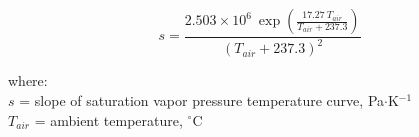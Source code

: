 \begin{equation}
\label{eq:sat}
	s = \frac{2.503\times 10^6\:\exp\left(\frac{17.27\: T_{air}}
			                                   {T_{air} + 237.3}\right)}
	         {\left(T_{air} + 237.3\right)^2}
\end{equation}

\noindent where: \\
\indent $s$ = slope of saturation vapor pressure temperature curve, Pa$\cdot$K$^{-1}$ \\
\indent $T_{air}$ = ambient temperature, $^{\circ}$C \\

